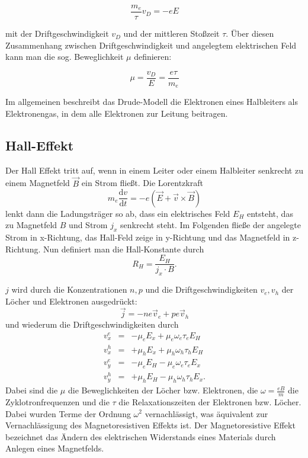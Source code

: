 \begin{equation}
\frac{m_e}{\tau}v_D = -eE
\end{equation}

mit der Driftgeschwindigkeit $v_D$ und der mittleren Stoßzeit $\tau$. Über diesen Zusammenhang zwischen Driftgeschwindigkeit und angelegtem elektrischen Feld kann man die sog. Beweglichkeit $\mu$ definieren:

\begin{equation}
\mu = \frac{v_D}{E}= \frac{e\tau}{m_e}
\end{equation}

Im allgemeinen beschreibt das Drude-Modell die Elektronen eines Halbleiters als Elektronengas, in dem alle Elektronen zur Leitung beitragen. 

\subsection{Hall-Effekt}
Der Hall Effekt tritt auf, wenn in einem Leiter oder einem Halbleiter senkrecht zu einem Magnetfeld $\vec B$ ein Strom fließt. Die Lorentzkraft
\begin{equation}
 m_e\frac{\mathrm d v}{\mathrm d t}= -e(\vec E + \vec v \times \vec B)
\end{equation}
lenkt dann die Ladungsträger so ab, dass ein elektrisches Feld $E_H$ entsteht, das zu Magnetfeld $B$ und Strom $j_x$ senkrecht steht. Im Folgenden fließe der angelegte Strom in x-Richtung, das Hall-Feld zeige in y-Richtung und das Magnetfeld in z-Richtung. Nun definiert man die Hall-Konstante durch 
\begin{equation}
 R_H=\frac{E_H}{j_x\cdot B}.
\end{equation}

$j$ wird durch die Konzentrationen $n,p$ und die Driftgeschwindigkeiten $v_e, v_h$ der Löcher und Elektronen ausgedrückt:
\begin{equation}
 \vec j=-ne\vec v_e+pe\vec v_h
\end{equation}
und wiederum die Driftgeschwindigkeiten durch 
\begin{eqnarray}
 v_x^e &=& -\mu_eE_x+\mu_e\omega_e\tau_eE_H\\
 v_x^h &=& +\mu_hE_x+\mu_h\omega_h\tau_hE_H\\
 v_y^e &=& -\mu_eE_H-\mu_e\omega_e\tau_eE_x\\
 v_y^h &=& +\mu_hE_H-\mu_h\omega_h\tau_hE_x.
\end{eqnarray}
Dabei sind die $\mu$ die Beweglichkeiten der Löcher bzw. Elektronen, die $\omega=\frac{eB}{m}$ die Zyklotronfrequenzen und die $\tau$ die Relaxationszeiten der Elektronen bzw. Löcher. Dabei  wurden Terme der Ordnung $\omega^2$ vernachlässigt, was äquivalent zur Vernachlässigung des Magnetoresistiven Effekts ist. Der Magnetoresistive Effekt bezeichnet das Ändern des elektrischen Widerstands eines Materials durch Anlegen eines Magnetfelds.

